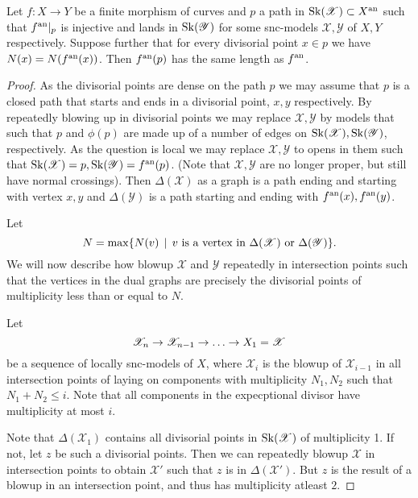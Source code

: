 \begin{lemma}\label{lem:equality_lenghts_preserve_mult}
	Let $f: X \to Y$ be a finite morphism of curves and $p$ a path in $\operatorname{Sk}(\mathscr X)\subset X{}^{\text{an}} $  such that $f{}^{\text{an}}|_p$ is injective and lands in $\operatorname{Sk}(\mathscr Y)$ for some snc-models $\mathscr X, \mathscr Y$ of $X, Y$ respectively. 
	Suppose further that for every divisorial point $x \in p$  we have $N(x) = N(f{}^{\text{an}}(x))$. 
	Then $f{}^{\text{an}}(p)$ has the same length as $f{}^{\text{an}}$. 
\end{lemma}
\begin{proof}
	As the divisorial points are dense on the path $p$ we may assume that $p$ is a closed path that starts and ends in a divisorial point, $x, y$ respectively.
	By repeatedly blowing up in divisorial points we may replace $\mathscr X, \mathscr Y$ by models that such that $p$ and $\phi(p)$ are made up of a number of edges on $\operatorname{Sk}(\mathscr X), \operatorname{Sk}(\mathscr Y)$, respectively. 
	As the question is local we may replace $\mathscr X, \mathscr Y$ to opens in them such that $\operatorname{Sk}(\mathscr X) = p, \operatorname{Sk}(\mathscr Y) = f{}^{\text{an}} (p)$. (Note that $\mathscr X, \mathscr Y$ are no longer proper, but still have normal crossings).  
	Then $\Delta(\mathscr X)$ as a graph is a path ending and starting with vertex $x, y$ and $\Delta(\mathscr Y)$ is a path starting and ending with $f{}^{\text{an}}(x), f{}^{\text{an}}(y)$. 

	Let \[
		N = \max \{N(v) \st v \text{ is a vertex in } \Delta(\mathscr X) \text{ or } \Delta(\mathscr Y)\} 
	.\] 
	We will now describe how blowup $\mathscr X$ and $\mathscr Y$ repeatedly in intersection points such that the vertices in the dual graphs are precisely the divisorial points of multiplicity less than or equal to $N$. 

	Let \[
	\mathscr X_n \to \mathscr X_{n - 1} \to \ldots \to \mathscr \mathscr X_1 = \mathscr X
	\] 
	be a sequence of locally snc-models of  $X$, where $\mathscr X_i$ is the blowup of $\mathscr X_{i-1}$ in all intersection points of laying on components with multiplicity $N_1, N_2$ such that $N_1 + N_2 \le i$. 
	Note that all components in the expecptional divisor have multiplicity at most $i$. 

	Note that $\Delta(\mathscr X_1)$ contains all divisorial points in $\operatorname{Sk}(\mathscr X)$ of multiplicity 1. If not, let $z$ be such a divisorial points. 
	Then we can repeatedly blowup $\mathscr X$ in intersection points to obtain $\mathscr X'$ such that $z$ is in $\Delta(\mathscr X')$. 
	But $z$ is the result of a blowup in an intersection point, and thus has multiplicity atleast $2$. 


\end{proof}

